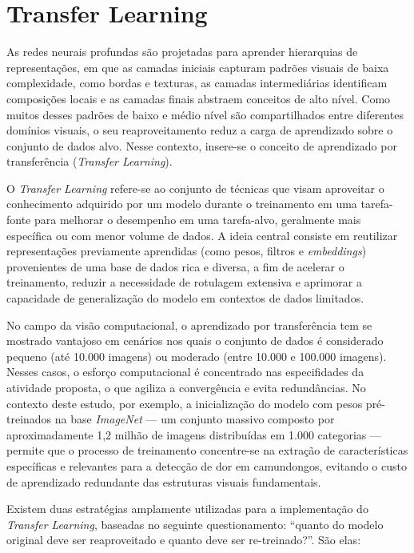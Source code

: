 \section{Transfer Learning}

As redes neurais profundas são projetadas para aprender hierarquias de representações, em que as camadas iniciais capturam padrões visuais de baixa complexidade, como bordas e texturas, as camadas intermediárias identificam composições locais e as camadas finais abstraem conceitos de alto nível. Como muitos desses padrões de baixo e médio nível são compartilhados entre diferentes domínios visuais, o seu reaproveitamento reduz a carga de aprendizado sobre o conjunto de dados alvo. Nesse contexto, insere-se o conceito de aprendizado por transferência (\textit{Transfer Learning}).

O \textit{Transfer Learning} refere-se ao conjunto de técnicas que visam aproveitar o conhecimento adquirido por um modelo durante o treinamento em uma tarefa-fonte para melhorar o desempenho em uma tarefa-alvo, geralmente mais específica ou com menor volume de dados. A ideia central consiste em reutilizar representações previamente aprendidas (como pesos, filtros e \textit{embeddings}) provenientes de uma base de dados rica e diversa, a fim de acelerar o treinamento, reduzir a necessidade de rotulagem extensiva e aprimorar a capacidade de generalização do modelo em contextos de dados limitados.

No campo da visão computacional, o aprendizado por transferência tem se mostrado vantajoso em cenários nos quais o conjunto de dados é considerado pequeno (até 10.000 imagens) ou moderado (entre 10.000 e 100.000 imagens). Nesses casos, o esforço computacional é concentrado nas especifidades da atividade proposta, o que agiliza a convergência e evita redundâncias. No contexto deste estudo, por exemplo, a inicialização do modelo com pesos pré-treinados na base \textit{ImageNet} — um conjunto massivo composto por aproximadamente 1,2 milhão de imagens distribuídas em 1.000 categorias — permite que o processo de treinamento concentre-se na extração de características específicas e relevantes para a detecção de dor em camundongos, evitando o custo de aprendizado redundante das estruturas visuais fundamentais.

Existem duas estratégias amplamente utilizadas para a implementação do \textit{Transfer Learning}, baseadas no seguinte questionamento: “quanto do modelo original deve ser reaproveitado e quanto deve ser re-treinado?”. São elas:


